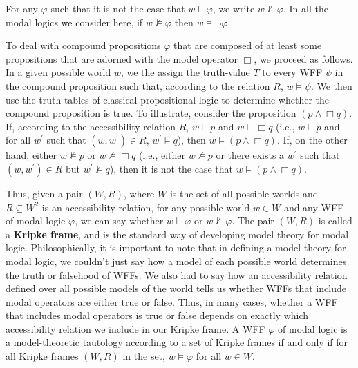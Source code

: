 \documentclass[11pt]{article}
\theoremstyle{definition}
\theoremstyle{remark}
\begin{document}
For any $\varphi$ such that it is not the case that $w\vDash \varphi$, we write $w\not\vDash \varphi$. In all the modal logics we consider here, if $w\not\vDash \varphi$ then $w\vDash \neg \varphi$.\par 


To deal with compound propositions $\varphi$ that are composed of at least some propositions that are adorned with the model operator $\Box$, we proceed as follows. In a given possible world $w$, we the assign the truth-value $T$ to every WFF $\psi$ in the compound proposition such that, according to the relation $R$, $w\vDash\psi$. We then use the truth-tables of classical propositional logic to determine whether the compound proposition is true. To illustrate, consider the proposition $(p\wedge\Box q)$. If, according to the accessibility relation $R$, $w\vDash p$ and $w\vDash\Box q$ (i.e., $w\vDash p$ and for all $w^{\prime}$ such that $(w,w^{\prime})\in R$, $w^{\prime}\vDash q$), then $w\vDash (p\wedge\Box q)$. If, on the other hand, either $w\not\vDash p$ or $w\not\vDash\Box q$ (i.e., either $w\not\vDash p$ or there exists a $w^{\prime}$ such that $(w,w^{\prime})\in R$ but $w^{\prime}\not\vDash q$), then it is not the case that $w\vDash (p\wedge\Box q)$.


Thus, given a pair $(W,R)$, where $W$ is the set of all possible worlds and $R\subseteq W^{2}$ is an accessibility relation, for any possible world $w\in W$ and any WFF of modal logic $\varphi$, we can say whether $w\vDash\varphi$ or $w\not\vDash\varphi$. The pair $(W,R)$ is called a \textbf{Kripke frame}, and is the standard way of developing model theory for modal logic. Philosophically, it is important to note that in defining a model theory for modal logic, we couldn't just say how a model of each possible world determines the truth or falsehood of WFFs. We also had to say how an accessibility relation defined over all possible models of the world tells us whether WFFs that include modal operators are either true or false. Thus, in many cases, whether a WFF that includes modal operators is true or false depends on exactly which accessibility relation we include in our Kripke frame. A WFF $\varphi$ of modal logic is a model-theoretic tautology according to a set of Kripke frames if and only if for all Kripke frames $(W,R)$ in the set, $w\vDash\varphi$ for all $w\in W$.\par 
\end{document}
